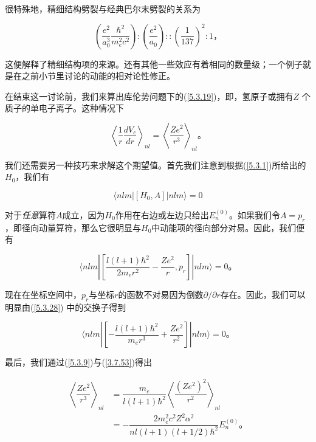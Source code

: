﻿\documentclass[UTF8,twoside]{ctexart}
\begin{document}
\noindent 很特殊地，精细结构劈裂与经典巴尔末劈裂的关系为

\begin{equation}
\left(\dfrac{e^2}{a_0^3}\dfrac{\hbar^2}{m_e^2 c^2}\right):\left(\dfrac{e^2}{a_0}\right) ::\left(\dfrac{1}{137}\right)^2:1\text{，}
\end{equation}

\noindent 这便解释了精细结构项的来源。还有其他一些效应有着相同的数量级；一个例子就是在之前小节里讨论的动能的相对论性修正。

在结束这一讨论前，我们来算出库伦势问题下的(\ref{5.3.19})，即，氢原子或拥有$Z$ 个质子的单电子离子。这种情况下

\begin{equation} \label{5.3.26}
\left\langle\dfrac{1}{r}\dfrac{dV_c}{dr}\right\rangle_{nl}= \left\langle\dfrac{Ze^2}{r^3}\right\rangle_{nl}\text{。}
\end{equation}

\noindent 我们还需要另一种技巧来求解这个期望值。首先我们注意到根据(\ref{5.3.1})所给出的$H_0$，我们有

\begin{equation} \label{5.3.27}
\langle nlm|[H_0,A]|nlm\rangle=0
\end{equation}

\noindent 对于\emph{任意}算符$A$成立，因为$H_0$作用在右边或左边只给出$E_n^{(0)}$。如果我们令$A=p_r$，即径向动量算符，那么它很明显与$H_0$中动能项的径向部分对易。因此，我们便有

\begin{equation} \label{5.3.28}
\langle nlm|\left[\dfrac{l(l+1)\hbar^2}{2m_er^2}-\dfrac{Ze^2}{r},p_r\right]|nlm\rangle=0\text{。}
\end{equation}

\noindent 现在在坐标空间中，$p_r$与坐标$r$的函数不对易因为倒数$\partial/\partial r$存在。因此，我们可以明显由(\ref{5.3.28}) 中的交换子得到

\begin{equation} \label{5.3.29}
\langle nlm|\left[-\dfrac{l(l+1)\hbar^2}{m_er^3}+\dfrac{Ze^2}{r^2}\right]|nlm\rangle=0\text{。}
\end{equation}

\noindent 最后，我们通过(\ref{5.3.9})与(\ref{3.7.53})得出

\begin{equation} \label{5.3.30}
\begin{split}
\left\langle\dfrac{Ze^2}{r^3}\right\rangle_{nl} &=\dfrac{m_e}{l(l+1)\hbar^2}\left\langle\dfrac{(Ze^2)^2}{r^2}\right\rangle_{nl} \\
&=-\dfrac{2m_e^2c^2Z^2\alpha^2}{nl(l+1)(l+1/2)\hbar^2}E_n^{(0)}\text{。}
\end{split}
\end{equation}
\end{document}
